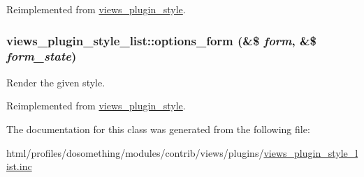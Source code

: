 Reimplemented from \hyperlink{classviews__plugin__style}{views\_\-plugin\_\-style}.\hypertarget{classviews__plugin__style__list_a37ec2449bb2119e4a8c3730cd458ecdb}{
\subsubsection[{options\_\-form}]{\setlength{\rightskip}{0pt plus 5cm}views\_\-plugin\_\-style\_\-list::options\_\-form (\&\$ {\em form}, \/  \&\$ {\em form\_\-state})}}
\label{classviews__plugin__style__list_a37ec2449bb2119e4a8c3730cd458ecdb}
Render the given style. 

Reimplemented from \hyperlink{classviews__plugin__style_afe3d437ff4398315b15c4e60975dbb1c}{views\_\-plugin\_\-style}.

The documentation for this class was generated from the following file:\begin{DoxyCompactItemize}
\item 
html/profiles/dosomething/modules/contrib/views/plugins/\hyperlink{views__plugin__style__list_8inc}{views\_\-plugin\_\-style\_\-list.inc}\end{DoxyCompactItemize}
